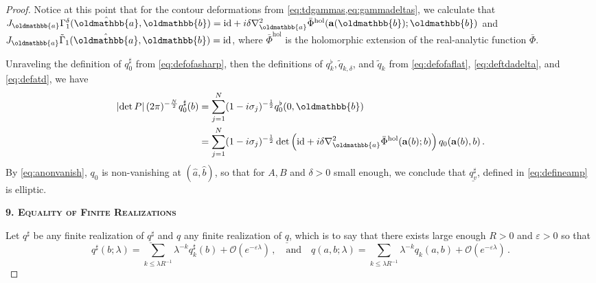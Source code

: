 \documentclass[
	fontsize=11pt, 
	twoside=false, 
	abstract=true, 
	a4paper,
]{scrartcl}
\newcommand{\eps}{\varepsilon}
\newcommand{\abs}[1]{\left\lvert#1\right\rvert}
\newcommand{\td}[1]{\tilde{#1}}
\newcommand{\an}{\quad\text{and}\quad}
\newcommand{\id}{\mathrm{id}}
\newcommand{\ud}[1]{\underline{#1}}
\newcommand{\mf}[1]{\oldmathbb{#1}}
\newcommand{\bsc}[1]{\textbf{\ebgaramond\textsc{#1}}}
\begin{document}
\begin{proof}
	Notice at this point that for the contour deformations from \cref{eq:tdgammas,eq:gammadeltas}, we calculate that $J_{\mf{a}} \Gamma^\delta_1(\hat{\mf{a}},\mf{b})=\id+i\delta \nabla_{\mf{a}}^2\bar{\Phi}^{\mathrm{hol}}(\mathbf{a}(\mf{b});\mf{b})$ and $J_{\mf{a}} \td{\Gamma}_1(\hat{\mf{a}},\mf{b}) = \id$, where $\bar{\Phi}^{\mathrm{hol}}$ is the holomorphic extension of the real-analytic function $\bar{\Phi}$. 

	Unraveling the definition of $q^\sharp_{0}$ from \cref{eq:defofasharp}, then the definitions of $q_k^\flat,\td{q}_{k,\delta}$, and $\td{q}_k$ from \cref{eq:defofaflat}, \cref{eq:deftdadelta}, and \cref{eq:defatd}, we have
	\begin{align*}
		\abs{\det P}(2\pi)^{-\frac{N}{2}}q^\sharp_{0}(b) &= \sum_{j=1}^{N}(1-i\sigma_j)^{-\frac{1}{2}}q^\flat_0(0,\mf{b}) \\
		&= \sum_{j=1}^{N}(1-i\sigma_j)^{-\frac{1}{2}}\det\left(\id+i\delta \nabla_{\mf{a}}^2\bar{\Phi}^{\mathrm{hol}}(\mathbf{a}(b);b)\right)q_0(\mathbf{a}(b),b)\,.
	\end{align*}
	By \cref{eq:anonvanish}, $q_0$ is non-vanishing at $(\hat a, \hat b)$, so that for $A, B$ and $\delta>0$ small enough, we conclude that $\ud{q^\sharp_v}$, defined in \cref{eq:defineamp} is elliptic.

	\bsc{9. Equality of Finite Realizations}

	Let $q^\sharp$ be any finite realization of $\ud{q^\sharp}$ and $q$ any finite realization of $\ud{q}$, %
	which is to say that there exists large enough $R>0$ and $\eps>0$ so that
	\begin{equation}\label{eq:reazofasharp}
		q^\sharp(b;\lambda) = \sum_{k \leq \lambda R^{-1}} \lambda^{-k} q^\sharp_{k}(b) + \mathcal{O}(e^{-\eps\lambda})\,,\an q(a,b;\lambda) = \sum_{k \leq \lambda R^{-1}} \lambda^{-k} q_{k}(a,b) + \mathcal{O}(e^{-\eps\lambda})\,.
	\end{equation}
	

\end{proof}
\end{document}
